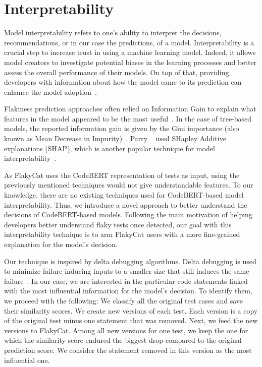 \section{Interpretability}
\label{sec:flakycat-interpretability}

Model interpretability refers to one's ability to interpret the decisions, recommendations, or in our case the predictions, of a model. Interpretability is a crucial step to increase trust in using a machine learning model. Indeed, it allows model creators to investigate potential biases in the learning processes and better assess the overall performance of their models.
On top of that, providing developers with information about how the model came to its prediction can enhance the model adoption~\cite{carvalho2019machine}. 

Flakiness prediction approaches often relied on Information Gain to explain what features in the model appeared to be the most useful~\cite{Pinto2020,FlakeFlagger,camara2021use}. In the case of tree-based models, the reported information gain is given by the Gini importance (also known as Mean Decrease in Impurity)~\cite{Featurei12:online}.
Parry \etal~\cite{flake16} used SHapley Additive explanations (SHAP), which is another popular technique for model interpretability~\cite{shaponline}. 

As FlakyCat uses the CodeBERT representation of tests as input, using the previously mentioned techniques would not give understandable features. To our knowledge, there are no existing techniques used for CodeBERT-based model interpretability. Thus, we introduce a novel approach to better understand the decisions of CodeBERT-based models. Following the main motivation of helping developers better understand flaky tests once detected, our goal with this interpretability technique is to arm FlakyCat users with a more fine-grained explanation for the model's decision.

Our technique is inspired by delta debugging algorithms. Delta debugging is used to minimize failure-inducing inputs to a smaller size that still induces the same failure~\cite{zeller2002simplifying}. In our case, we are interested in the particular code statements linked with the most influential information for the model's decision.
To identify them, we proceed with the following: We classify all the original test cases and save their similarity scores. We create new versions of each test. Each version is a copy of the original test minus one statement that was removed. 
Next, we feed the new versions to FlakyCat. Among all new versions for one test, we keep the one for which the similarity score endured the biggest drop compared to the original prediction score. 
We consider the statement removed in this version as the most influential one.
